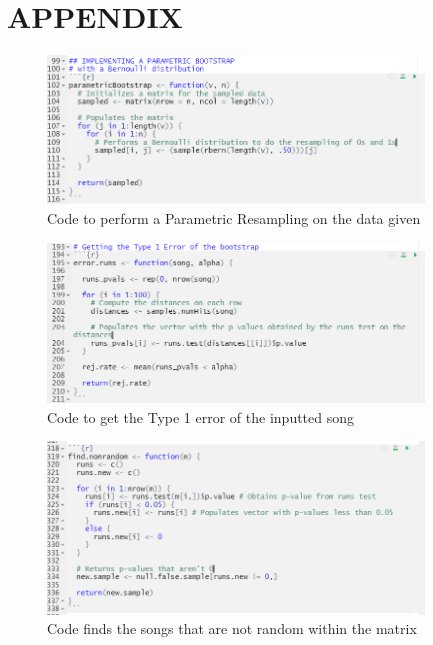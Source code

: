 \documentclass[12pt, letterpaper]{article}
\begin{document}
\section{APPENDIX}

\begin{figure}[!hb]
\centering
\includegraphics[width=10cm]{ParametricBootstrapCode.png}
\caption{Code to perform a Parametric Resampling on the data given}
\label{fig: Parametric Bootstrap Code}
\end{figure}

\begin{figure}
\centering
\includegraphics[width=10cm]{Type1ErrCode.png}
\caption{Code to get the Type 1 error of the inputted song}
\label{fig: Type 1 Error Code}
\end{figure}

\begin{figure}
\centering
\includegraphics[width=10cm]{FindNonRandomCode.png}
\caption{Code finds the songs that are not random within the matrix}
\label{fig: Find Nonrandom Songs Code}
\end{figure}
\end{document}
